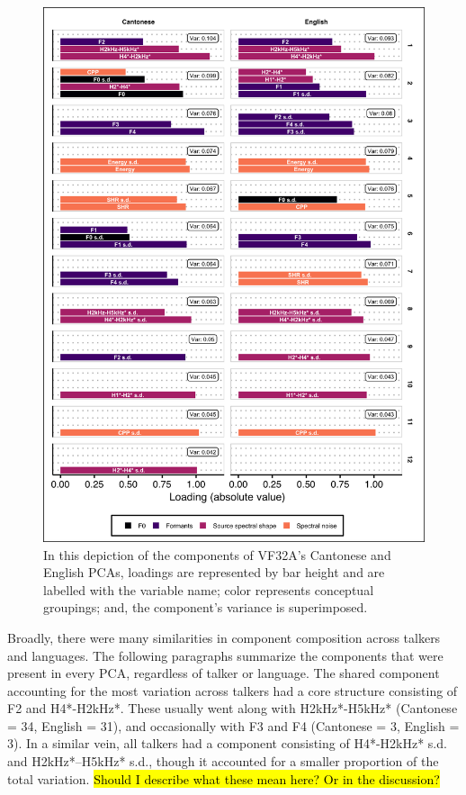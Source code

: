 \begin{figure}[htbp]
\begin{center}
\includegraphics[width=0.875\linewidth]{figures/ch3_pca_vf32a_vert5in.png} 
\caption{In this depiction of the components of VF32A's Cantonese and English PCAs, loadings are represented by bar height and are labelled with the variable name; color represents conceptual groupings; and, the component's variance is superimposed.}
\label{ch3:fig:VF32A}
\end{center}
\end{figure}

Broadly, there were many similarities in component composition across talkers and languages. The following paragraphs summarize the components that were present in every PCA, regardless of talker or language. The shared component accounting for the most variation across talkers had a core structure consisting of F2 and H4*-H2kHz*. These usually went along with H2kHz*-H5kHz* (Cantonese = 34, English = 31), and occasionally with F3 and F4 (Cantonese = 3, English = 3). In a similar vein, all talkers had a component consisting of H4*-H2kHz* s.d. and H2kHz*--H5kHz* s.d., though it accounted for a smaller proportion of the total variation. \hl{Should I describe what these mean here? Or in the discussion?}

